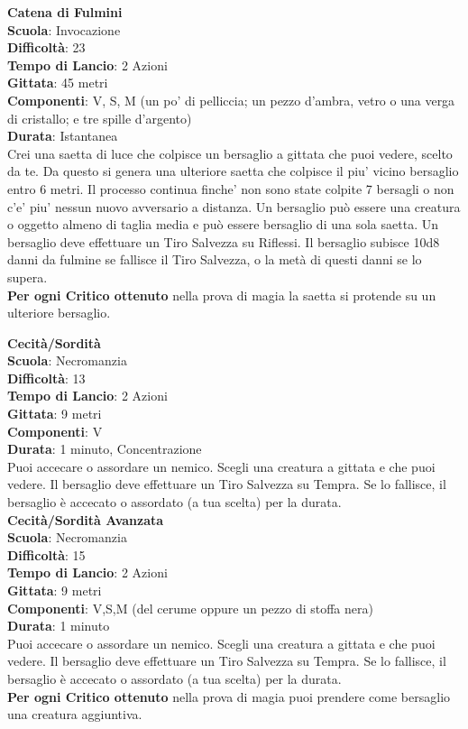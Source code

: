\begin{multicols}{2}
\medskip\textbf{Catena di Fulmini}\\
\textbf{Scuola}: Invocazione\\
\textbf{Difficoltà}: 23\\
\textbf{Tempo di Lancio}: 2 Azioni\\
\textbf{Gittata}: 45 metri\\
\textbf{Componenti}: V, S, M (un po' di pelliccia; un pezzo d'ambra, vetro o una verga di cristallo; e tre spille d'argento)\\
\textbf{Durata}: Istantanea\\
Crei una saetta di luce che colpisce un bersaglio a gittata che puoi vedere, scelto da te. Da questo si genera una ulteriore saetta che colpisce il piu' vicino bersaglio entro 6 metri. Il processo continua finche' non sono state colpite 7 bersagli o non c'e' piu' nessun nuovo avversario a distanza. Un bersaglio può essere una creatura o oggetto almeno di taglia media e può essere bersaglio di una sola saetta. Un bersaglio deve effettuare un Tiro Salvezza su Riflessi. Il bersaglio subisce 10d8 danni da fulmine se fallisce il Tiro Salvezza, o la metà di questi danni se lo supera.\\
\textbf{Per ogni Critico ottenuto} nella prova di magia la saetta si protende su un ulteriore bersaglio.

\medskip\textbf{Cecità/Sordità}\\
\textbf{Scuola}: Necromanzia\\
\textbf{Difficoltà}: 13\\
\textbf{Tempo di Lancio}: 2 Azioni\\
\textbf{Gittata}: 9 metri\\
\textbf{Componenti}: V\\
\textbf{Durata}: 1 minuto, Concentrazione\\
Puoi accecare o assordare un nemico. Scegli una creatura a gittata e che puoi vedere. Il bersaglio deve effettuare un Tiro Salvezza su Tempra. Se lo fallisce, il bersaglio è accecato o assordato (a tua scelta) per la durata.\\

\medskip\textbf{Cecità/Sordità Avanzata}\\
\textbf{Scuola}: Necromanzia\\
\textbf{Difficoltà}: 15\\
\textbf{Tempo di Lancio}: 2 Azioni\\
\textbf{Gittata}: 9 metri\\
\textbf{Componenti}: V,S,M (del cerume oppure un pezzo di stoffa nera)\\
\textbf{Durata}: 1 minuto\\
Puoi accecare o assordare un nemico. Scegli una creatura a gittata e che puoi vedere. Il bersaglio deve effettuare un Tiro Salvezza su Tempra. Se lo fallisce, il bersaglio è accecato o assordato (a tua scelta) per la durata.\\
\textbf{Per ogni Critico ottenuto} nella prova di magia puoi prendere come bersaglio una creatura aggiuntiva.


\end{multicols}
